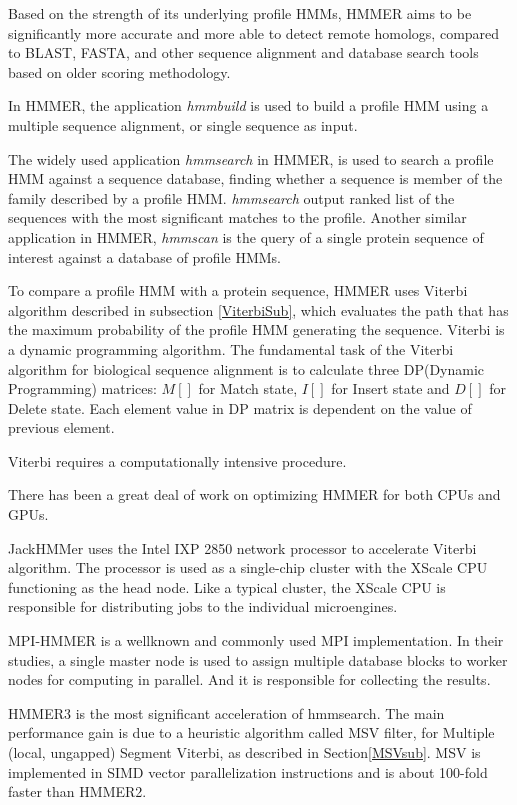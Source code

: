 Based on the strength of its underlying profile HMMs, HMMER aims to be significantly more accurate and more able to detect remote homologs, compared to BLAST, FASTA, and other sequence alignment and database search tools based on older scoring methodology.

In HMMER, the application \emph{hmmbuild} is used to build a profile HMM using a multiple sequence alignment, or single sequence as input. 

The widely used application \emph{hmmsearch} in HMMER, is used to search a profile HMM against a sequence database, finding whether a sequence is member of the family described by a profile HMM. \emph{hmmsearch} output ranked list of the sequences with the most significant matches to the profile. Another similar application in HMMER, \emph{hmmscan} is the query of a single protein sequence of interest against a database of profile HMMs.

To compare a profile HMM with a protein sequence, HMMER uses Viterbi algorithm described in subsection \ref{ViterbiSub}, which evaluates the path that has the maximum probability of the profile HMM generating the sequence. Viterbi is a dynamic programming algorithm.
The fundamental task of the Viterbi algorithm for biological sequence alignment is to calculate three DP(Dynamic Programming) matrices: $M[{ }]$ for Match state, $I[{ }]$ for Insert state and $D[{ }]$ for Delete state. Each element value in DP matrix is dependent on the value of previous element.

Viterbi requires a computationally intensive procedure.

There has been a great deal of work on optimizing HMMER for both CPUs and GPUs. 

JackHMMer \citep{Wun} uses the Intel IXP 2850 network processor to accelerate Viterbi algorithm. The processor is used as a single-chip cluster with the XScale CPU functioning as the head node. Like a typical cluster, the XScale CPU is responsible for distributing jobs to the individual microengines. 

MPI-HMMER \citep{Walters2006} is a wellknown and commonly used MPI implementation. In their studies, a single master node is used to assign multiple database blocks to worker nodes for computing in parallel. And it is responsible for collecting the results.

HMMER3 \citep{HMMER3} is the most significant acceleration of hmmsearch. The main performance gain is due to a heuristic algorithm called MSV filter, for Multiple (local, ungapped) Segment Viterbi, as described in Section\ref{MSVsub}. MSV is implemented in SIMD vector parallelization instructions and is about 100-fold faster than HMMER2.

